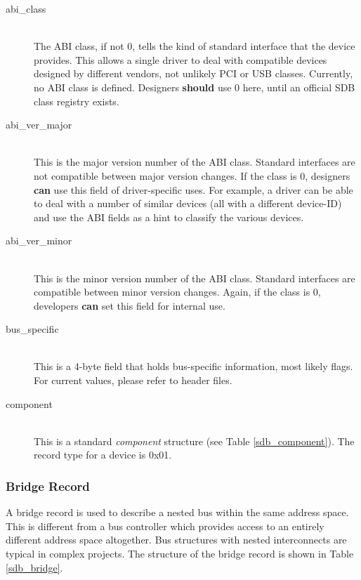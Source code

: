 \documentclass[a4paper, 12pt]{article}
\begin{document}
\begin{description}
\item[abi\_class] \hfill \\
The ABI class, if not 0, tells the kind of standard interface that the device provides. This
allows a single driver to deal with compatible devices designed by different vendors, not unlikely
PCI or USB classes.  Currently, no ABI class is defined. Designers \textbf{should} use 0 here,
until an official SDB class registry exists.

\item[abi\_ver\_major] \hfill \\
This is the major version number of the ABI class. Standard interfaces are not compatible between
major version changes.  If the class is 0, designers \textbf{can} use this field of driver-specific uses. For
example, a driver can be able to deal with a number of similar devices (all with a different device-ID)
and use the ABI fields as a hint to classify the various devices.

\item[abi\_ver\_minor] \hfill \\
This is the minor version number of the ABI class. Standard interfaces are compatible between
minor version changes. Again, if the class is 0, developers \textbf{can} set this field for internal use.

\item[bus\_specific] \hfill \\
This is a 4-byte field that holds bus-specific information, most likely flags. For current
values, please refer to header files.

\item[component] \hfill \\
This is a standard \textit{component} structure (see Table \ref{sdb_component}). The record type
for a device is 0x01.
\end{description}

\subsubsection{Bridge Record}

A bridge record is used to describe a nested bus within the same address space. This is different from
a bus controller which provides access to an entirely different address space altogether. Bus
structures with nested interconnects are typical in complex projects.
The structure of the bridge record is shown in Table \ref{sdb_bridge}.
\end{document}
